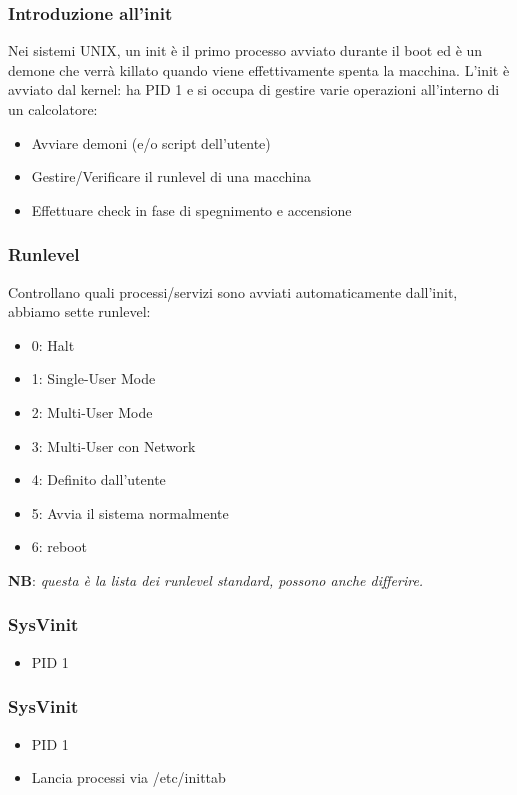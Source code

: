 \documentclass{beamer}
\begin{document}
\begin{frame}
	\frametitle{Introduzione all'init}
	Nei sistemi UNIX, un init \`e il primo processo avviato durante il boot ed \`e un demone che verr\`a killato quando viene effettivamente spenta la macchina. L'init \`e avviato dal kernel: ha PID 1 e si occupa di gestire varie operazioni all'interno di un calcolatore:
	\begin{itemize}
		\item Avviare demoni (e/o script dell'utente)
		\item Gestire/Verificare il runlevel di una macchina
		\item Effettuare check in fase di spegnimento e accensione \\
	\end{itemize}
\end{frame}




\begin{frame}
\frametitle{Runlevel}
Controllano quali processi/servizi sono avviati automaticamente dall'init, abbiamo sette runlevel:
\begin{itemize}
	\item 0: Halt
	\item 1: Single-User Mode
	\item 2: Multi-User Mode
	\item 3: Multi-User con Network
	\item 4: Definito dall'utente
	\item 5: Avvia il sistema normalmente
	\item 6: reboot
\end{itemize}

\textbf{NB}: \textit{questa \`e la lista dei runlevel standard, possono anche differire.}
\end{frame}

\begin{frame}
	\frametitle{SysVinit}
	\begin{itemize}
		\item PID 1
	\end{itemize}
\end{frame}

\begin{frame}
	\frametitle{SysVinit}
	\begin{itemize}
		\item PID 1
		\item Lancia processi via /etc/inittab
	\end{itemize}
\end{frame}
\end{document}
